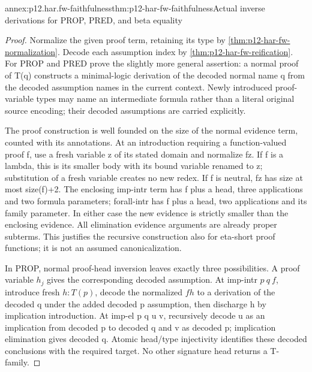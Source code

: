 \begin{annexitem}{annex:p12.har.fw-faithfulness}{thm:p12-har-fw-faithfulness}{Actual inverse derivations for PROP, PRED, and beta equality}
\begin{proof}
Normalize the given proof term, retaining its type by
\cref{thm:p12-har-fw-normalization}. Decode each assumption index
by \cref{thm:p12-har-fw-reification}. For PROP and PRED prove the
slightly more general assertion: a normal proof of T(q) constructs a
minimal-logic derivation of the decoded normal name q from the decoded
assumption names in the current context. Newly introduced proof-variable
types may name an intermediate formula rather than a literal original
source encoding; their decoded assumptions are carried explicitly.

The proof construction is well founded on the size of the normal
evidence term, counted with its annotations. At an introduction requiring
a function-valued proof f, use a fresh variable z of its stated domain
and normalize fz. If f is a lambda, this is its smaller body with
its bound variable renamed to z; substitution of a fresh variable creates
no new redex. If f is neutral, fz has size at most size(f)+2.
The enclosing imp-intr term has f plus a head, three applications and
two formula parameters; forall-intr has f plus a head, two applications
and its family parameter. In either case the new evidence is strictly
smaller than the enclosing evidence. All elimination evidence arguments
are already proper subterms. This justifies the recursive construction
also for eta-short proof functions; it is not an assumed canonicalization.

In PROP, normal proof-head inversion leaves exactly three possibilities.
A proof variable \(h_j\) gives the corresponding decoded assumption.
At imp-intr \(p\ q\ f\), introduce fresh \(h:T(p)\), decode the normalized \(fh\)
to a derivation of the decoded q under the added decoded p assumption,
then discharge h by implication introduction. At imp-el p q u v,
recursively decode u as an implication from decoded p to decoded q
and v as decoded p; implication elimination gives decoded q.
Atomic head/type injectivity identifies these decoded conclusions with
the required target. No other signature head returns a T-family.


\end{proof}
\end{annexitem}
